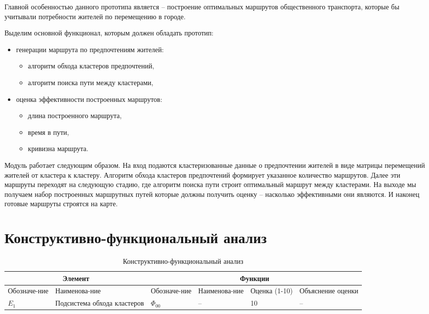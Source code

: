 Главной особенностью данного прототипа является -- построение оптимальных маршрутов общественного 
транспорта, которые бы учитывали потребности жителей по перемещению в городе. 

Выделим основной функционал, которым должен обладать прототип:
\begin{itemize}
    \item генерации маршрута по предпочтениям жителей:
    \begin{itemize}
        \item алгоритм обхода кластеров предпочтений,
        \item алгоритм поиска пути между кластерами,
    \end{itemize}
    \item оценка эффективности построенных маршрутов:
    \begin{itemize}
        \item длина построенного маршрута,
        \item время в пути,
        \item кривизна маршрута.
    \end{itemize}
\end{itemize}

Модуль работает следующим образом. На вход подаются кластеризованные данные о предпочтении жителей в виде 
матрицы перемещений жителей от кластера к кластеру. Алгоритм обхода кластеров предпочтений формирует 
указанное количество маршрутов. Далее эти маршруты переходят на следующую стадию, где алгоритм поиска 
пути строит оптимальный маршрут между кластерами. На выходе мы получаем набор построенных маршрутных 
путей которые должны получить оценку -- насколько эффективными они являются. И наконец готовые маршруты 
строятся на карте.

\chapter{Конструктивно-функциональный анализ}

\begin{table}[h]
    \center
    \caption{Конструктивно-функциональный анализ}
    \begin{tabularx}{\textwidth}{|X|X|X|X|X|X|}
        \hline
        \multicolumn{2}{|c|}{Элемент} & \multicolumn{4}{|c|}{Функции} \\ \hline
        Обозначе-ние & Наименова-ние & Обозначе-ние & Наименова-ние & Оценка (1-10) & Объяснение оценки \\ \hline
        \( E_1 \) & Подсистема обхода кластеров & \( \Phi_{00} \) & -- & 10 & -- \\ \hline
    \end{tabularx}
\end{table}

